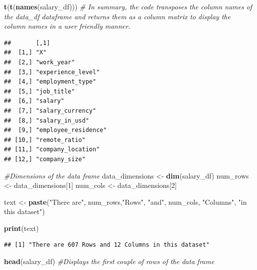 \documentclass[
]{article}
\newenvironment{Shaded}{\begin{snugshade}}{\end{snugshade}}
\newcommand{\CommentTok}[1]{\textcolor[rgb]{0.56,0.35,0.01}{\textit{#1}}}
\newcommand{\DecValTok}[1]{\textcolor[rgb]{0.00,0.00,0.81}{#1}}
\newcommand{\FunctionTok}[1]{\textcolor[rgb]{0.13,0.29,0.53}{\textbf{#1}}}
\newcommand{\NormalTok}[1]{#1}
\newcommand{\OtherTok}[1]{\textcolor[rgb]{0.56,0.35,0.01}{#1}}
\newcommand{\StringTok}[1]{\textcolor[rgb]{0.31,0.60,0.02}{#1}}
\begin{document}
\begin{Shaded}
\begin{Highlighting}[]
\FunctionTok{t}\NormalTok{(}\FunctionTok{t}\NormalTok{(}\FunctionTok{names}\NormalTok{(salary\_df))) }\CommentTok{\# In summary, the code transposes the column names of the data\_df dataframe and returns them as a column matrix to display the column names in a user friendly manner.}
\end{Highlighting}
\end{Shaded}

\begin{verbatim}
##       [,1]                
##  [1,] "X"                 
##  [2,] "work_year"         
##  [3,] "experience_level"  
##  [4,] "employment_type"   
##  [5,] "job_title"         
##  [6,] "salary"            
##  [7,] "salary_currency"   
##  [8,] "salary_in_usd"     
##  [9,] "employee_residence"
## [10,] "remote_ratio"      
## [11,] "company_location"  
## [12,] "company_size"
\end{verbatim}

\begin{Shaded}
\begin{Highlighting}[]
\CommentTok{\#Dimensions of the data frame}
\NormalTok{data\_dimensions }\OtherTok{\textless{}{-}} \FunctionTok{dim}\NormalTok{(salary\_df)}
\NormalTok{num\_rows }\OtherTok{\textless{}{-}}\NormalTok{ data\_dimensions[}\DecValTok{1}\NormalTok{]}
\NormalTok{num\_cols }\OtherTok{\textless{}{-}}\NormalTok{ data\_dimensions[}\DecValTok{2}\NormalTok{]}

\NormalTok{text }\OtherTok{\textless{}{-}} \FunctionTok{paste}\NormalTok{(}\StringTok{"There are"}\NormalTok{, num\_rows,}\StringTok{"Rows"}\NormalTok{, }\StringTok{"and"}\NormalTok{, num\_cols, }\StringTok{"Columns"}\NormalTok{, }\StringTok{"in this dataset"}\NormalTok{)}

\FunctionTok{print}\NormalTok{(text)}
\end{Highlighting}
\end{Shaded}

\begin{verbatim}
## [1] "There are 607 Rows and 12 Columns in this dataset"
\end{verbatim}

\begin{Shaded}
\begin{Highlighting}[]
\FunctionTok{head}\NormalTok{(salary\_df)  }\CommentTok{\#Displays the first couple of rows of the data frame}
\end{Highlighting}
\end{Shaded}
\end{document}
